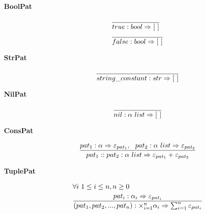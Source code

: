 \documentclass[10pt]{luthercs}
\begin{document}
{\begin{description}
\item[{\textbf{BoolPat}}] \begin{gather}
\begin{split}& \frac{}{true:bool \Rightarrow [~]} \\
& \frac{}{false:bool \Rightarrow [~]}\end{split}\notag
\end{gather}
\end{description}


\begin{description}
\item[{\textbf{StrPat}}] \begin{gather}
\begin{split}\frac{}{string\_constant:str \Rightarrow [~]}\end{split}\notag
\end{gather}
\end{description}


\begin{description}
\item[{\textbf{NilPat}}] \begin{gather}
\begin{split}\frac{}{nil:\alpha~list\Rightarrow[~]}\end{split}\notag
\end{gather}
\end{description}


\begin{description}
\item[{\textbf{ConsPat}}] \begin{gather}
\begin{split}\frac{pat_1:\alpha\Rightarrow  \varepsilon_{pat_1},~~pat_2:\alpha~list\Rightarrow \varepsilon_{pat_2}}
     {pat_1::pat_2 : \alpha~list\Rightarrow \varepsilon_{pat_1}+\varepsilon_{pat_2}}\end{split}\notag
\end{gather}
\end{description}


\begin{description}
\item[{\textbf{TuplePat}}] \begin{gather}
\begin{split}&  \forall i~1 \leq i \leq n, n \geq 0\\
& \frac{pat_i : \alpha_i \Rightarrow \varepsilon_{pat_i}}
       {(pat_1,pat_2,...,pat_n): \times_{i=1}^{n}\alpha_i\Rightarrow \sum^{n}_{i=1}\varepsilon_{pat_i}}\end{split}\notag
\end{gather}
\end{description}

}
\end{document}
